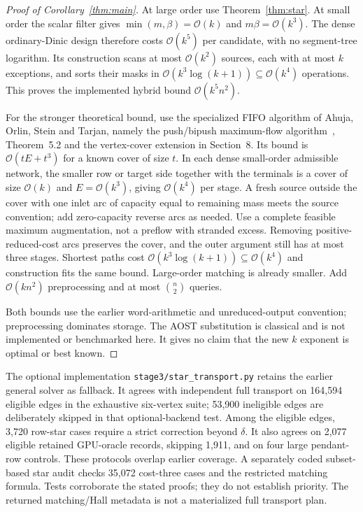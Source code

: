 \documentclass[11pt]{article}
\theoremstyle{remark}
\newcommand{\Oh}{\mathcal O}
\begin{document}
\begin{proof}[Proof of Corollary~\ref{thm:main}]
At large order use Theorem~\ref{thm:star}. At small order the scalar filter gives $\min(m,\beta)=\Oh(k)$ and $m\beta=\Oh(k^3)$. The dense ordinary-Dinic design therefore costs $\Oh(k^5)$ per candidate, with no segment-tree logarithm. Its construction scans at most $\Oh(k^2)$ sources, each with at most $k$ exceptions, and sorts their masks in $\Oh(k^3\log(k+1))\subseteq\Oh(k^4)$ operations. This proves the implemented hybrid bound $\Oh(k^5n^2)$.

For the stronger theoretical bound, use the specialized FIFO algorithm of Ahuja, Orlin, Stein and Tarjan, namely the push/bipush maximum-flow algorithm~\cite{aost}, Theorem~5.2 and the vertex-cover extension in Section~8. Its bound is $\Oh(tE+t^3)$ for a known cover of size $t$. In each dense small-order admissible network, the smaller row or target side together with the terminals is a cover of size $\Oh(k)$ and $E=\Oh(k^3)$, giving $\Oh(k^4)$ per stage. A fresh source outside the cover with one inlet arc of capacity equal to remaining mass meets the source convention; add zero-capacity reverse arcs as needed. Use a complete feasible maximum augmentation, not a preflow with stranded excess. Removing positive-reduced-cost arcs preserves the cover, and the outer argument still has at most three stages. Shortest paths cost $\Oh(k^3\log(k+1))\subseteq\Oh(k^4)$ and construction fits the same bound. Large-order matching is already smaller. Add $\Oh(kn^2)$ preprocessing and at most $\binom n2$ queries.

Both bounds use the earlier word-arithmetic and unreduced-output convention; preprocessing dominates storage. The AOST substitution is classical and is not implemented or benchmarked here. It gives no claim that the new $k$ exponent is optimal or best known.
\end{proof}

The optional implementation \texttt{stage3/star\_transport.py} retains the earlier general solver as fallback. It agrees with independent full transport on 164,594 eligible edges in the exhaustive six-vertex suite; 53,900 ineligible edges are deliberately skipped in that optional-backend test. Among the eligible edges, 3,720 row-star cases require a strict correction beyond $\delta$. It also agrees on 2,077 eligible retained GPU-oracle records, skipping 1,911, and on four large pendant-row controls. These protocols overlap earlier coverage. A separately coded subset-based star audit checks 35,072 cost-three cases and the restricted matching formula. Tests corroborate the stated proofs; they do not establish priority. The returned matching/Hall metadata is not a materialized full transport plan.
\end{document}
